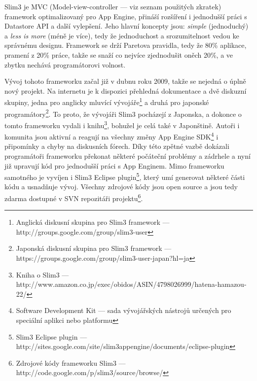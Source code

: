 Slim3 je MVC (Model-view-controller --- viz seznam použitých zkratek) framework optimalizovaný pro App Engine, přináší rozšíření i jednodušší práci s Datastore API a další vylepšení. Jeho hlavní koncepty jsou: \emph{simple} (jednoduchý) a \emph{less is more} (méně je více), tedy že jednoduchost a srozumitelnost vedou ke správnému designu. Framework se drží Paretova pravidla, tedy že 80\% aplikace, pramení z 20\% práce, takže se snaží co nejvíce zjednodušit oněch 20\%, a ve zbytku nechává programátorovi volnost.

Vývoj tohoto frameworku začal  již v dubnu roku 2009, takže se nejedná o úplně nový projekt. Na internetu je k dispozici přehledná dokumentace a dvě diskuzní skupiny, jedna pro anglicky mluvící vývojáře\footnote{Anglická diskusní skupina pro Slim3 framework ---http://groups.google.com/group/slim3-user} a druhá pro japonské programátory\footnote{Japonská diskusní skupina pro Slim3 framework --- https://groups.google.com/group/slim3-user-japan?hl=ja}. To proto, že vývojáři Slim3 pocházejí z Japonska, a dokonce o tomto frameworku vydali i knihu\footnote{Kniha o Slim3 --- http://www.amazon.co.jp/exec/obidos/ASIN/4798026999/hatena-hamazou-22/}, bohužel je celá také v Japonštině. Autoři i komunita jsou aktivní a reagují na všechny změny App Engine SDK\footnote{Software Development Kit --- sada vývojářských nástrojů určených pro speciální aplikci nebo platformu} i připomínky a chyby na diskusních fórech. Díky této zpětné vazbě dokázali programátoři frameworku překonat některé počáteční problémy a zádrhele a nyní již upravují kód pro jednodušší práci s App Enginem. Mimo frameworku samotného je vyvíjen i Slim3 Eclipse plugin\footnote{Slim3 Eclipse plugin --- http://sites.google.com/site/slim3appengine/documents/eclipse-plugin}, který umí generovat některé části kódu a usnadňuje vývoj. Všechny zdrojové kódy jsou open source a jsou tedy zdarma dostupné v SVN repozitáři projektu\footnote{Zdrojové kódy frameworku Slim3 --- http://code.google.com/p/slim3/source/browse/}.

